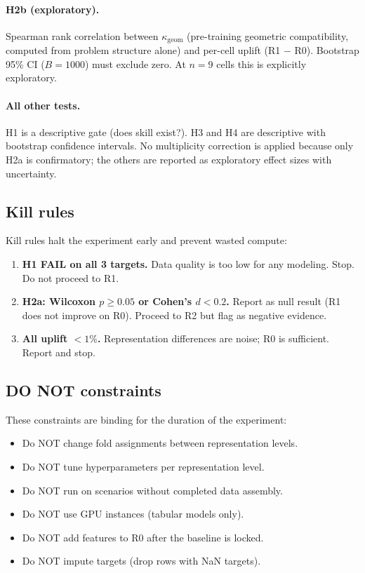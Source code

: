 \paragraph{H2b (exploratory).}
Spearman rank correlation between $\kappa_\text{geom}$ (pre-training
geometric compatibility, computed from problem structure alone) and
per-cell uplift (R1 $-$ R0). Bootstrap 95\% CI ($B = 1000$) must exclude
zero. At $n{=}9$ cells this is explicitly exploratory.

\paragraph{All other tests.}
H1 is a descriptive gate (does skill exist?). H3 and H4 are descriptive
with bootstrap confidence intervals. No multiplicity correction is
applied because only H2a is confirmatory; the others are reported as
exploratory effect sizes with uncertainty.

\subsection{Kill rules}
\label{app:doe-kill}

Kill rules halt the experiment early and prevent wasted compute:

\begin{enumerate}
\item \textbf{H1 FAIL on all 3 targets.} Data quality is too low for any
  modeling. Stop. Do not proceed to R1.
\item \textbf{H2a: Wilcoxon $p \geq 0.05$ or Cohen's $d < 0.2$.}
  Report as null result (R1 does not improve on R0). Proceed to R2 but
  flag as negative evidence.
\item \textbf{All uplift $< 1\%$.} Representation differences are noise;
  R0 is sufficient. Report and stop.
\end{enumerate}

\subsection{DO NOT constraints}
\label{app:doe-donot}

These constraints are binding for the duration of the experiment:
\begin{itemize}
\item Do NOT change fold assignments between representation levels.
\item Do NOT tune hyperparameters per representation level.
\item Do NOT run on scenarios without completed data assembly.
\item Do NOT use GPU instances (tabular models only).
\item Do NOT add features to R0 after the baseline is locked.
\item Do NOT impute targets (drop rows with NaN targets).
\end{itemize}

